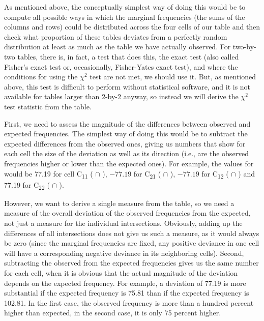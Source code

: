 As mentioned above, the conceptually simplest way of doing this would be to compute all possible ways in which the marginal frequencies (the sums of the columns and rows) could be distributed  across the four cells of our table and then check what proportion of these tables deviates from a perfectly random  distribution at least as much as the table we have actually observed. For two\hyp{}by\hyp{}two tables, there is, in fact, a test that does this, the exact test  (also called Fisher's exact test or, occasionally, Fisher\hyp{}Yates exact test), and where the conditions for using the $\chi^2$  test are not met, we should use it. But, as mentioned above, this test is difficult to perform without statistical software, and it is not available for tables larger  than 2\hyp{}by\hyp{}2 anyway, so instead we will derive the $\chi^2$ test statistic from the table.

First, we need to assess the magnitude of the differences between observed and expected  frequencies. The simplest way of doing this would be to subtract the expected differences from the observed ones, giving us numbers that show for each cell the size  of the deviation as well as its direction (i.e., are the observed frequencies  higher or lower than the expected ones). For example, the values for   would be 77.19 for cell C\textsubscript{11} ( $\cap$ ), $-77.19$ for C\textsubscript{21} ( $\cap$ ), $-77.19$ for C\textsubscript{12} ( $\cap$ ) and 77.19 for C\textsubscript{22} ( $\cap$ ).

However, we want to derive a single measure from the table, so we need a measure of the overall deviation of the observed frequencies  from the expected,  not just a measure for the individual intersections. Obviously, adding up the differences of all intersections does not give us such a measure,  as it would always be zero (since the marginal frequencies are fixed, any positive deviance in one cell will have a corresponding negative deviance in its neighboring cells). Second, subtracting the observed from the expected  frequencies gives us the same number for each cell, when it is obvious that the actual magnitude of the deviation depends on the expected frequency. For example, a deviation of 77.19 is more substantial if the expected frequency is 75.81 than if the expected frequency is 102.81. In the first case, the observed frequency  is more than a hundred percent higher than expected, in the second case, it is only 75 percent higher.

